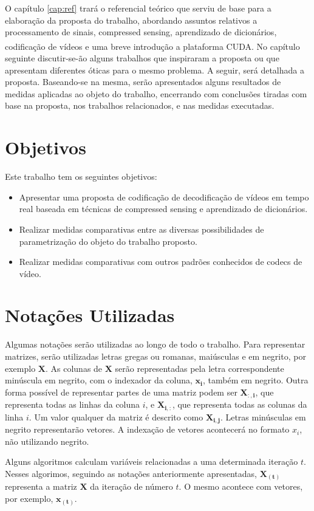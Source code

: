 \documentclass[cic,tc]{iiufrgs}
\renewcommand{\vec}[1]{\bm{#1}}
\newcommand{\mat}[1]{\bm{#1}}
\newcommand{\reg}{\textsuperscript{\textregistered}}
\begin{document}
O capítulo \autoref{cap:ref} trará o referencial teórico que serviu de base
para a elaboração da proposta do trabalho,
abordando assuntos relativos a processamento de sinais, compressed sensing, 
aprendizado de dicionários, codificação de vídeos e uma breve introdução 
a plataforma CUDA\reg.
No capítulo seguinte discutir-se-ão alguns trabalhos que inspiraram a 
proposta ou que apresentam diferentes óticas para o mesmo problema.
A seguir, será detalhada a proposta. 
Baseando-se na mesma, serão apresentados alguns resultados de medidas 
aplicadas ao objeto do trabalho, encerrando com conclusões tiradas com 
base na proposta, nos trabalhos relacionados, e nas medidas executadas. 

\section{Objetivos}
Este trabalho tem os seguintes objetivos:
\begin{itemize}
    \item Apresentar uma proposta de codificação de decodificação de vídeos
    em tempo real baseada em técnicas de compressed sensing e aprendizado de 
    dicionários.
    \item Realizar medidas comparativas entre as diversas possibilidades 
    de parametrização do objeto do trabalho proposto.
    \item Realizar medidas comparativas com outros padrões conhecidos de 
    codecs de vídeo.
\end{itemize}

\section{Notações Utilizadas}
Algumas notações serão utilizadas ao longo de todo o trabalho.
Para representar matrizes, serão utilizadas letras gregas ou romanas, 
maiúsculas e em negrito, por exemplo $\mat{X}$.
As colunas de $\mat{X}$ serão representadas pela letra correspondente 
minúscula em negrito, com o indexador da coluna, $\vec{x_i}$, também em negrito.
Outra forma possível de representar partes de uma matriz podem ser $\mat{X_{:,i}}$,
que representa todas as linhas da coluna $i$, e $\mat{X_{i,:}}$, que representa 
todas as colunas da linha $i$.
Um valor qualquer da matriz é descrito como $\mat{X_{i,j}}$.
Letras minúsculas em negrito representarão vetores.
A indexação de vetores acontecerá no formato $x_i$, não utilizando negrito. %

Alguns algoritmos calculam variáveis relacionadas a uma determinada iteração $t$.
Nesses algorimos, seguindo as notações anteriormente apresentadas, $\mat{X_{(t)}}$ 
representa a matriz $\mat{X}$ da iteração de número $t$.
O mesmo acontece com vetores, por exemplo, $\vec{x_{(t)}}$.
\end{document}
